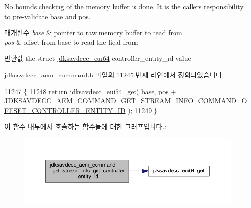 No bounds checking of the memory buffer is done. It is the caller\textquotesingle{}s responsibility to pre-\/validate base and pos.


\begin{DoxyParams}{매개변수}
{\em base} & pointer to raw memory buffer to read from. \\
\hline
{\em pos} & offset from base to read the field from; \\
\hline
\end{DoxyParams}
\begin{DoxyReturn}{반환값}
the struct \hyperlink{structjdksavdecc__eui64}{jdksavdecc\+\_\+eui64} controller\+\_\+entity\+\_\+id value 
\end{DoxyReturn}


jdksavdecc\+\_\+aem\+\_\+command.\+h 파일의 11245 번째 라인에서 정의되었습니다.


\begin{DoxyCode}
11247 \{
11248     \textcolor{keywordflow}{return} \hyperlink{group__eui64_ga2652311a25a6b91cddbed75c108c7031}{jdksavdecc\_eui64\_get}( base, pos + 
      \hyperlink{group__command__get__stream__info_ga14aadccda606f36f8b1808d5cebeae08}{JDKSAVDECC\_AEM\_COMMAND\_GET\_STREAM\_INFO\_COMMAND\_OFFSET\_CONTROLLER\_ENTITY\_ID}
       );
11249 \}
\end{DoxyCode}


이 함수 내부에서 호출하는 함수들에 대한 그래프입니다.\+:
\nopagebreak
\begin{figure}[H]
\begin{center}
\leavevmode
\includegraphics[width=350pt]{group__command__get__stream__info_ga540e60201d42805b46b935969f3cb6e7_cgraph}
\end{center}
\end{figure}


